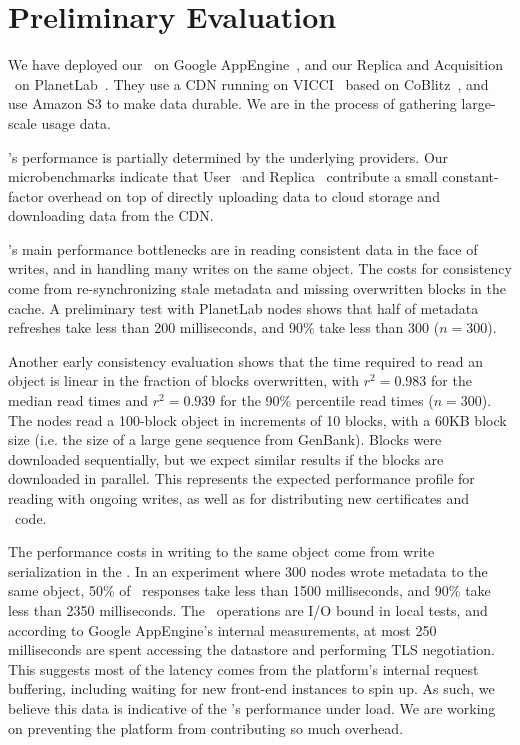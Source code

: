 \section{Preliminary Evaluation}
\label{sec:evaluation}

We have deployed our \MS\ on Google AppEngine~\cite{google-appengine},
and our Replica and Acquisition \SGs\ on PlanetLab~\cite{planetlab}.
They use a CDN running on VICCI~\cite{vicci} based on 
CoBlitz~\cite{coblitz}, and use Amazon S3 to make data durable.  We are in the
process of gathering large-scale usage data.

\Syndicate's performance is partially determined by the 
underlying providers.  Our microbenchmarks indicate that User \SG\
and Replica \SG\ contribute a small constant-factor overhead on top of directly 
uploading data to cloud storage and downloading data from the CDN.

\Syndicate's main performance bottlenecks are in reading consistent data
in the face of writes, and in handling many writes on the same object.
The costs for consistency come from re-synchronizing
stale metadata and missing overwritten blocks in the cache.  A preliminary
test with PlanetLab nodes shows that half of metadata refreshes take less than 200 milliseconds, and 
90\% take less than 300 ($n=300$).

Another early consistency evaluation shows that the time required to read an object
is linear in the fraction of blocks overwritten,
with $r^2=0.983$ for the median read times and $r^2=0.939$ for the 90\% percentile read
times ($n=300$).  The nodes read a 100-block object in increments of 10 blocks,
with a 60KB block size (i.e. the size of a large gene sequence from GenBank).
Blocks were downloaded sequentially, but we expect similar results if the 
blocks are downloaded in parallel.  This represents the expected performance 
profile for reading with ongoing writes, as well as for distributing new certificates and \SG\ code.

The performance costs in writing to the same object come from write serialization in the \MS.
In an experiment where 300 nodes wrote metadata to the same object,
50\% of \MS\ responses take less than 1500 milliseconds, and 90\% take less than 2350 milliseconds.
The \MS\ operations are I/O bound in local tests, and according to Google AppEngine's internal measurements, at
most 250 milliseconds are spent accessing the datastore and performing TLS negotiation.
This suggests most of the latency comes from the platform's internal request buffering,
including waiting for new front-end instances to spin up.  As such, we believe this data
is indicative of the \MS's performance under load.  We are working on preventing the 
platform from contributing so much overhead.

